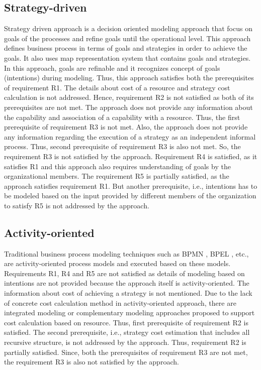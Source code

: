 \subsection{Strategy-driven} 
Strategy driven approach is a decision oriented modeling approach that focus on goals of the processes and refine goals until the operational level. This approach defines business process in terms of goals and strategies in order to achieve the goals. It also uses map representation system that contains goals and strategies. In this approach, goals are refinable and it recognizes concept of goals (intentions) during modeling. Thus, this approach satisfies both the prerequisites of requirement R1. The details about cost of a resource and strategy cost calculation is not addressed. Hence, requirement R2 is not satisfied as both of its prerequisites are not met. The approach does not provide any information about the capability and association of a capability with a resource. Thus, the first prerequisite of requirement R3 is not met. Also, the approach does not provide any information regarding the execution of a strategy as an independent informal process. Thus, second prerequisite of requirement R3 is also not met. So, the requirement R3 is not satisfied by the approach. Requirement R4 is satisfied, as it satisfies R1 and this approach also requires understanding of goals by the organizational members. The requirement R5 is partially satisfied, as the approach satisfies requirement R1. But another prerequisite, i.e., intentions has to be modeled based on the input provided by different members of the organization to satisfy R5 is not addressed by the approach. 

\subsection{Activity-oriented} 
Traditional business process modeling techniques such as BPMN \cite{bpm2011}, BPEL \cite{Std.2007}, etc., are activity-oriented process models and executed based on these models. Requirements R1, R4 and R5 are not satisfied as details of modeling based on intentions are not provided because the approach itself is activity-oriented. The information about cost of achieving a strategy is not mentioned. Due to the lack of concrete cost calculation method in activity-oriented approach, there are integrated modeling or complementary modeling approaches \cite{Bankhofer2013,Sampathkumaran2013} proposed to support cost calculation based on resource. Thus, first prerequisite of requirement R2 is satisfied. The second prerequisite, i.e., strategy cost estimation that includes all recursive structure, is not addressed by the approach. Thus, requirement R2 is partially satisfied. Since, both the prerequisites of requirement R3 are not met, the requirement R3 is also not satisfied by the approach. 

